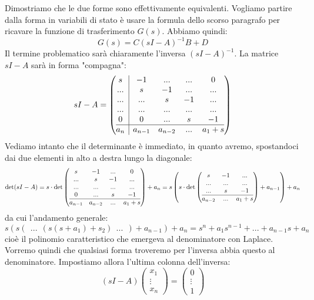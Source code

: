 \documentclass[a4paper,11pt]{article}
\begin{document}
Dimostriamo che le due forme sono effettivamente equivalenti.
Vogliamo partire dalla forma in variabili di stato è usare la formula dello scorso paragrafo per ricavare la funzione di trasferimento $G(s)$.
Abbiamo quindi:
$$
G(s) = C(sI - A)^{-1} B + D
$$
Il termine problematico sarà chiaramente l'inversa $(sI - A)^{-1}$.
La matrice $sI - A$ sarà in forma "compagna":
$$
sI - A = 
\left(\begin{array}{@{}c | cccc@{}}
	s & -1 & ... & ... & 0 \\
	... & s & -1 & ... & ... \\
	... & ... & s & -1 & ... \\ 
	... & ... & ... & ... & ... \\
	0 & 0 & ... & s & -1 \\
	\hline
	a_n & a_{n - 1} & a_{n - 2} & ... & a_1 + s
\end{array}\right)
$$
Vediamo intanto che il determinante è immediato, in quanto avremo, spostandoci dai due elementi in alto a destra lungo la diagonale:
$$
\det(sI - A) = s \cdot \det 
\left(\begin{array}{@{}cccc@{}}
	 s & -1 & ... & 0 \\
	 ... & s & -1 & ... \\
	 ... & ... & ... & ... \\
	 0 & ... & s & -1 \\
	\hline
	 a_{n - 1} & a_{n - 2} & ... & a_1 + s
\end{array}\right) 
+ a_n = s \left( s \cdot \det 
\left(\begin{array}{@{}ccc@{}}
	   s & -1 & ... \\
		 ... & ... & ... \\
	  ... & s & -1 \\
	\hline
		a_{n - 2} & ... & a_1 + s
\end{array}\right)
+ a_{n - 1} \right) + a_n
$$
da cui l'andamento generale:
$$
s \left( s\left( \ \  ... \ \  \left( s(s + a_1) + s_2 \right) \ \  ... \ \  \right) + a_{n - 1} \right) + a_n = s^n + a_1 s^{n - 1} + ... + a_{n - 1} s + a_n
$$
cioè il polinomio caratteristico che emergeva al denominatore con Laplace.
Vorremo quindi che qualsiasi forma troveremo per l'inversa abbia questo al denominatore.
Impostiamo allora l'ultima colonna dell'inversa:
$$
(sI - A) \begin{pmatrix}
	x_1 \\ \vdots \\ x_n
\end{pmatrix} =
\begin{pmatrix}
0 \\ \vdots \\  1
\end{pmatrix}
$$
\end{document}
